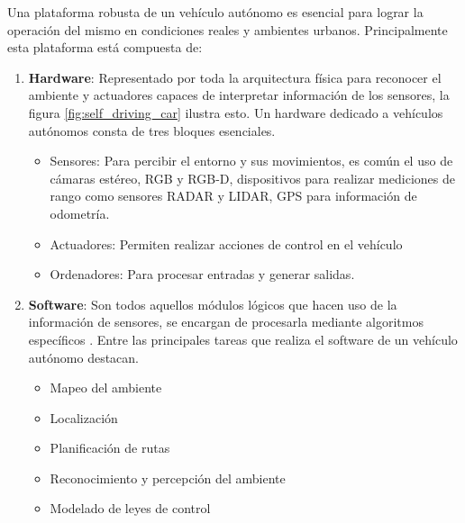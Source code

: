 Una plataforma robusta de un vehículo autónomo es esencial para lograr la operación del mismo en condiciones reales y ambientes urbanos. Principalmente esta plataforma está compuesta de:
\begin{enumerate}
    \item \textbf{Hardware}: Representado por toda la arquitectura física para reconocer el ambiente y actuadores capaces de interpretar información de los sensores, la figura \ref{fig:self_driving_car} ilustra esto. Un hardware dedicado a vehículos autónomos consta de tres bloques esenciales.
    \begin{itemize}
        \item Sensores: Para percibir el entorno y sus movimientos, es común el uso de cámaras estéreo, RGB y RGB-D, dispositivos para realizar mediciones de rango como sensores RADAR y LIDAR, GPS para información de odometría.


        \item Actuadores: Permiten realizar acciones de control en el vehículo
        \item Ordenadores: Para procesar entradas y generar salidas.
    \end{itemize}
    
    \item \textbf{Software}: Son todos aquellos módulos lógicos que hacen uso de la información de sensores, se encargan de procesarla mediante algoritmos específicos \cite{levinson2011towards}. Entre las principales tareas que realiza el software de un vehículo autónomo destacan.
    \begin{itemize}
        \item Mapeo del ambiente
        \item Localización
        \item Planificación de rutas
        \item Reconocimiento y percepción del ambiente
        \item Modelado de leyes de control
    \end{itemize}
\end{enumerate}


